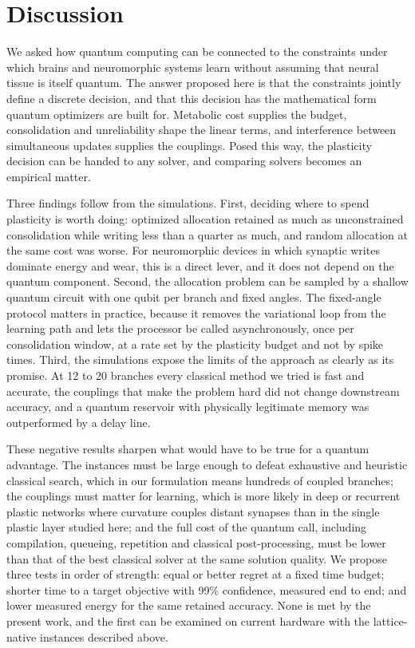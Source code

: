 \section*{Discussion}

We asked how quantum computing can be connected to the constraints under which brains and neuromorphic systems learn without assuming that neural tissue is itself quantum. The answer proposed here is that the constraints jointly define a discrete decision, and that this decision has the mathematical form quantum optimizers are built for. Metabolic cost supplies the budget, consolidation and unreliability shape the linear terms, and interference between simultaneous updates supplies the couplings. Posed this way, the plasticity decision can be handed to any solver, and comparing solvers becomes an empirical matter.

Three findings follow from the simulations. First, deciding where to spend plasticity is worth doing: optimized allocation retained as much as unconstrained consolidation while writing less than a quarter as much, and random allocation at the same cost was worse. For neuromorphic devices in which synaptic writes dominate energy and wear, this is a direct lever, and it does not depend on the quantum component. Second, the allocation problem can be sampled by a shallow quantum circuit with one qubit per branch and fixed angles. The fixed-angle protocol matters in practice, because it removes the variational loop from the learning path and lets the processor be called asynchronously, once per consolidation window, at a rate set by the plasticity budget and not by spike times. Third, the simulations expose the limits of the approach as clearly as its promise. At 12 to 20 branches every classical method we tried is fast and accurate, the couplings that make the problem hard did not change downstream accuracy, and a quantum reservoir with physically legitimate memory was outperformed by a delay line.

These negative results sharpen what would have to be true for a quantum advantage. The instances must be large enough to defeat exhaustive and heuristic classical search, which in our formulation means hundreds of coupled branches; the couplings must matter for learning, which is more likely in deep or recurrent plastic networks where curvature couples distant synapses than in the single plastic layer studied here; and the full cost of the quantum call, including compilation, queueing, repetition and classical post-processing, must be lower than that of the best classical solver at the same solution quality\cite{abbas2024,koch2026}. We propose three tests in order of strength: equal or better regret at a fixed time budget; shorter time to a target objective with 99\% confidence, measured end to end; and lower measured energy for the same retained accuracy. None is met by the present work, and the first can be examined on current hardware with the lattice-native instances described above.

